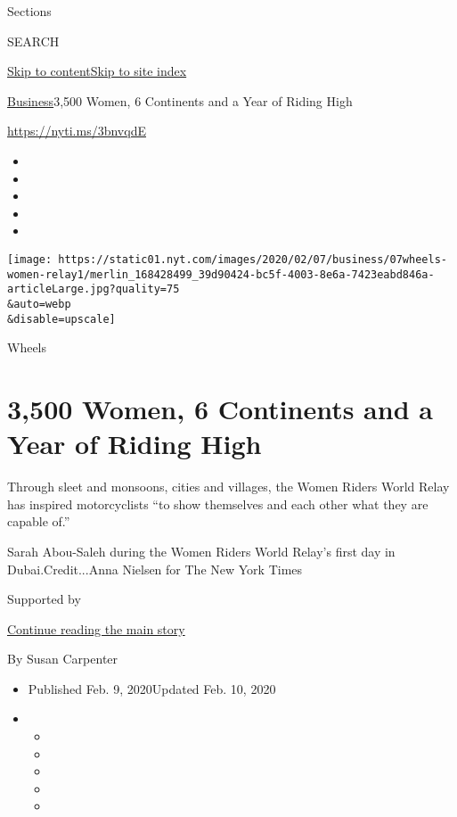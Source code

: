 Sections

SEARCH

\protect\hyperlink{site-content}{Skip to
content}\protect\hyperlink{site-index}{Skip to site index}

\href{/section/business}{Business}\textbar{}3,500 Women, 6 Continents
and a Year of Riding High

\href{https://nyti.ms/3bnvqdE}{https://nyti.ms/3bnvqdE}

\begin{itemize}
\item
\item
\item
\item
\item
\end{itemize}

\texttt{[image: https://static01.nyt.com/images/2020/02/07/business/07wheels-women-relay1/merlin\_168428499\_39d90424-bc5f-4003-8e6a-7423eabd846a-articleLarge.jpg?quality=75\\\&auto=webp\\\&disable=upscale]}

Wheels

\hypertarget{3500-women-6-continents-and-a-year-of-riding-high}{%
\section{3,500 Women, 6 Continents and a Year of Riding
High}\label{3500-women-6-continents-and-a-year-of-riding-high}}

Through sleet and monsoons, cities and villages, the Women Riders World
Relay has inspired motorcyclists ``to show themselves and each other
what they are capable of.''

Sarah Abou-Saleh during the Women Riders World Relay's first day in
Dubai.Credit...Anna Nielsen for The New York Times

Supported by

\protect\hyperlink{after-sponsor}{Continue reading the main story}

By Susan Carpenter

\begin{itemize}
\item
  Published Feb. 9, 2020Updated Feb. 10, 2020
\item
  \begin{itemize}
  \item
  \item
  \item
  \item
  \item
  \end{itemize}
\end{itemize}

